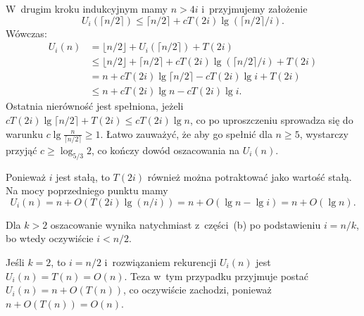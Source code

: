 W~drugim kroku indukcyjnym mamy $n>4i$ i~przyjmujemy założenie
\[
    U_i(\lceil n/2\rceil) \le \lceil n/2\rceil+cT(2i)\lg(\lceil n/2\rceil/i).
\]
Wówczas:
\begin{align*}
    U_i(n) &= \lfloor n/2\rfloor+U_i(\lceil n/2\rceil)+T(2i) \\
	&\le \lfloor n/2\rfloor+\lceil n/2\rceil+cT(2i)\lg(\lceil n/2\rceil/i)+T(2i) \\
	&= n+cT(2i)\lg\lceil n/2\rceil-cT(2i)\lg i+T(2i) \\
	&\le n+cT(2i)\lg n-cT(2i)\lg i.
\end{align*}
Ostatnia nierówność jest spełniona, jeżeli $cT(2i)\lg\lceil n/2\rceil+T(2i)\le cT(2i)\lg n$, co po uproszczeniu sprowadza się do warunku $c\lg\frac{n}{\lceil n/2\rceil}\ge1$. Łatwo zauważyć, że aby go spełnić dla $n\ge5$, wystarczy przyjąć $c\ge\log_{5/3}2$, co kończy dowód oszacowania na $U_i(n)$.

\subproblem %
Ponieważ $i$ jest stałą, to $T(2i)$ również można potraktować jako wartość stałą. Na mocy poprzedniego punktu mamy
\[
	U_i(n) = n+O(T(2i)\lg(n/i)) = n+O(\lg n-\lg i) = n+O(\lg n).
\]

\subproblem %
Dla $k>2$ oszacowanie wynika natychmiast z~części~(b) po podstawieniu $i=n/k$, bo wtedy oczywiście $i<n/2$.

Jeśli $k=2$, to $i=n/2$ i~rozwiązaniem rekurencji $U_i(n)$ jest $U_i(n)=T(n)=O(n)$. Teza w~tym przypadku przyjmuje postać $U_i(n)=n+O(T(n))$, co oczywiście zachodzi, ponieważ $n+O(T(n))=O(n)$.

\endinput
